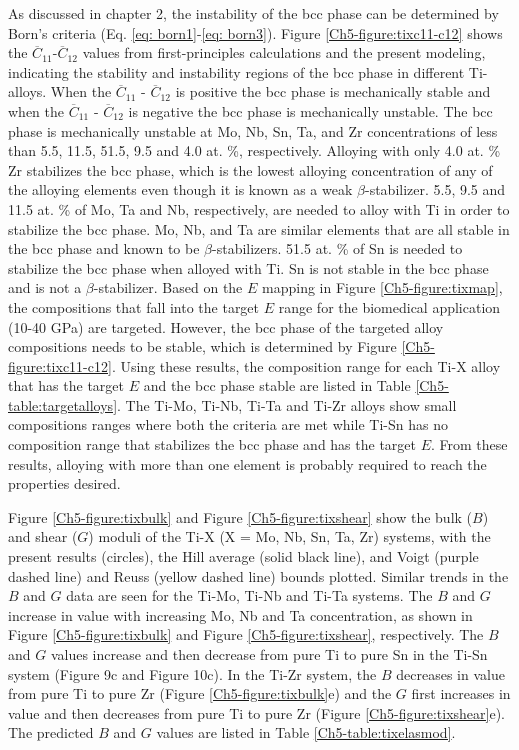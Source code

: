 As discussed in chapter 2, the instability of the bcc phase can be determined by Born's criteria (Eq. \ref{eq: born1}-\ref{eq: born3}). Figure \ref{Ch5-figure:tixc11-c12} shows the $\overline{C}_{11}$-$\overline{C}_{12}$ values from first-principles calculations and the present modeling, indicating the stability and instability regions of the bcc phase in different Ti-alloys. When the $\overline{C}_{11}$ - $\overline{C}_{12}$ is positive the bcc phase is mechanically stable and when the $\overline{C}_{11}$ - $\overline{C}_{12}$ is negative the bcc phase is mechanically unstable. The bcc phase is mechanically unstable at Mo, Nb, Sn, Ta, and Zr concentrations of less than 5.5, 11.5, 51.5, 9.5 and 4.0 at. \%, respectively. Alloying with only 4.0 at. \% Zr stabilizes the bcc phase, which is the lowest alloying concentration of any of the alloying elements even though it is known as a weak $\beta$-stabilizer. 5.5, 9.5 and 11.5 at. \% of Mo, Ta and Nb, respectively, are needed to alloy with Ti in order to stabilize the bcc phase. Mo, Nb, and Ta are similar elements that are all stable in the bcc phase and known to be $\beta$-stabilizers. 51.5 at. \% of Sn is needed to stabilize the bcc phase when alloyed with Ti. Sn is not stable in the bcc phase and is not a $\beta$-stabilizer. Based on the $E$ mapping in Figure \ref{Ch5-figure:tixmap}, the compositions that fall into the target $E$ range for the biomedical application (10-40 GPa) are targeted. However, the bcc phase of the targeted alloy compositions needs to be stable, which is determined by Figure \ref{Ch5-figure:tixc11-c12}. Using these results, the composition range for each Ti-X alloy that has the target $E$ and the bcc phase stable are listed in Table \ref{Ch5-table:targetalloys}. The Ti-Mo, Ti-Nb, Ti-Ta and Ti-Zr alloys show small compositions ranges where both the criteria are met while Ti-Sn has no composition range that stabilizes the bcc phase and has the target $E$. From these results, alloying with more than one element is probably required to reach the properties desired. 

Figure \ref{Ch5-figure:tixbulk} and Figure \ref{Ch5-figure:tixshear} show the bulk ($B$) and shear ($G$) moduli of the Ti-X (X = Mo, Nb, Sn, Ta, Zr) systems, with the present results (circles), the Hill average (solid black line), and Voigt (purple dashed line) and Reuss (yellow dashed line) bounds plotted. Similar trends in the $B$ and $G$ data are seen for the Ti-Mo, Ti-Nb and Ti-Ta systems. The $B$ and $G$ increase in value with increasing Mo, Nb and Ta concentration, as shown in Figure \ref{Ch5-figure:tixbulk} and Figure \ref{Ch5-figure:tixshear}, respectively. The $B$ and $G$ values increase and then decrease from pure Ti to pure Sn in the Ti-Sn system (Figure 9c and Figure 10c). In the Ti-Zr system, the $B$ decreases in value from pure Ti to pure Zr (Figure \ref{Ch5-figure:tixbulk}e) and the $G$ first increases in value and then decreases from pure Ti to pure Zr (Figure \ref{Ch5-figure:tixshear}e). The predicted $B$ and $G$ values are listed in Table \ref{Ch5-table:tixelasmod}. 


